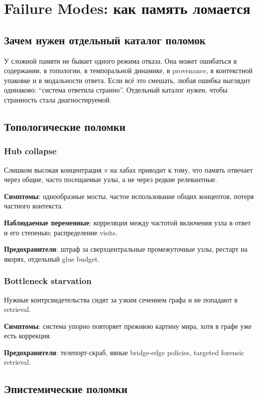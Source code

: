 \chapter{Failure Modes: как память ломается}
\label{ch:failuremodes}

\section{Зачем нужен отдельный каталог поломок}

У сложной памяти не бывает одного режима отказа. Она может ошибаться в содержании,
в топологии, в темпоральной динамике, в provenance, в контекстной упаковке и в
модальности ответа. Если всё это смешать, любая ошибка выглядит одинаково:
``система ответила странно''. Отдельный каталог нужен, чтобы странность стала
диагностируемой.

\section{Топологические поломки}

\subsection*{Hub collapse}
Слишком высокая концентрация $\pi$ на хабах приводит к тому, что память отвечает
через общие, часто посещаемые узлы, а не через редкие релевантные.

\textbf{Симптомы}: однообразные мосты, частое использование общих концептов,
потеря частного контекста.

\textbf{Наблюдаемые переменные}: корреляция между частотой включения узла в ответ
и его степенью; распределение visits.

\textbf{Предохранители}: штраф за сверхцентральные промежуточные узлы, рестарт на
якорях, отдельный glue budget.

\subsection*{Bottleneck starvation}
Нужные контрсвидетельства сидят за узким сечением графа и не попадают в retrieval.

\textbf{Симптомы}: система упорно повторяет прежнюю картину мира, хотя в графе уже
есть коррекция.

\textbf{Предохранители}: телепорт-скраб, явные bridge-edge policies, targeted
forensic retrieval.

\section{Эпистемические поломки}

